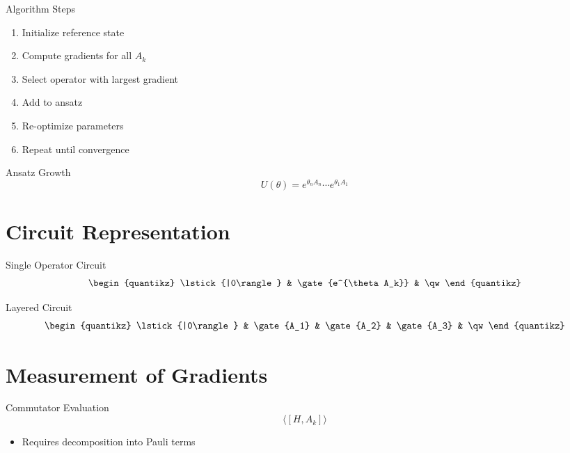 \documentclass{beamer}
\begin{document}
\begin{frame}{Algorithm Steps}
\begin{enumerate}
\item Initialize reference state
\item Compute gradients for all $A_k$
\item Select operator with largest gradient
\item Add to ansatz
\item Re-optimize parameters
\item Repeat until convergence
\end{enumerate}
\end{frame}


\begin{frame}{Ansatz Growth}
\[
U(\theta) =
e^{\theta_n A_n} \cdots e^{\theta_1 A_1}
\]
\end{frame}

\section{Circuit Representation}

\begin{frame}{Single Operator Circuit}
\[
\begin{quantikz}
\lstick{|0\rangle} & \gate{e^{\theta A_k}} & \qw
\end{quantikz}
\]
\end{frame}


\begin{frame}{Layered Circuit}
\[
\begin{quantikz}
\lstick{|0\rangle} & \gate{A_1} & \gate{A_2} & \gate{A_3} & \qw
\end{quantikz}
\]
\end{frame}

\section{Measurement of Gradients}

\begin{frame}{Commutator Evaluation}
\[
\langle [H,A_k] \rangle
\]
\begin{itemize}
\item Requires decomposition into Pauli terms
\end{itemize}
\end{frame}
\end{document}
